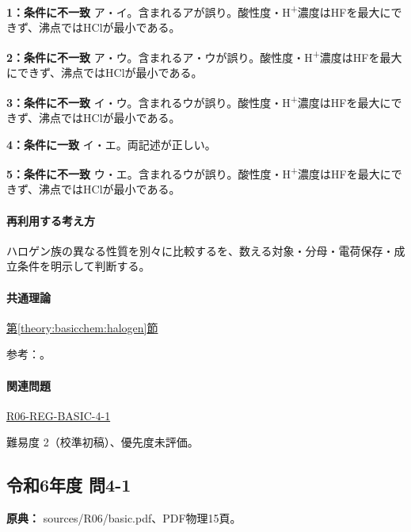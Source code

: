 \noindent\textbf{1：条件に不一致} ア・イ。含まれるアが誤り。酸性度・H\textsuperscript{+}濃度はHFを最大にできず、沸点ではHClが最小である。\par

\noindent\textbf{2：条件に不一致} ア・ウ。含まれるア・ウが誤り。酸性度・H\textsuperscript{+}濃度はHFを最大にできず、沸点ではHClが最小である。\par

\noindent\textbf{3：条件に不一致} イ・ウ。含まれるウが誤り。酸性度・H\textsuperscript{+}濃度はHFを最大にできず、沸点ではHClが最小である。\par

\noindent\textbf{4：条件に一致} イ・エ。両記述が正しい。\par

\noindent\textbf{5：条件に不一致} ウ・エ。含まれるウが誤り。酸性度・H\textsuperscript{+}濃度はHFを最大にできず、沸点ではHClが最小である。\par

\paragraph{再利用する考え方} ハロゲン族の異なる性質を別々に比較するを、数える対象・分母・電荷保存・成立条件を明示して判断する。

\paragraph{共通理論} \hyperref[theory:basicchem:halogen]{第\ref*{theory:basicchem:halogen}節}

\par 参考：\cite{purdue_halogens,rsc_halogen,nist_halogen_properties,msu_hydrogen_bonding,purdue_acid_strength,yale_hydrohalic}。

\paragraph{関連問題} \hyperref[q:r06-reg-basic-4-1]{R06-REG-BASIC-4-1}

\par 難易度 2（校準初稿）、優先度未評価。

\subsection{令和6年度 問4-1}
\label{q:r06-reg-basic-4-1}

\noindent\textbf{原典：} sources/R06/basic.pdf、PDF物理15頁。

